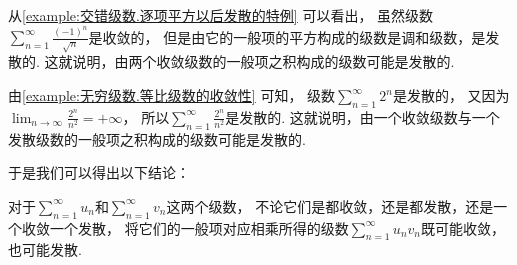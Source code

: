 从\cref{example:交错级数.逐项平方以后发散的特例} 可以看出，
虽然级数\(\sum_{n=1}^\infty \frac{(-1)^n}{\sqrt{n}}\)是收敛的，
但是由它的一般项的平方构成的级数是调和级数，是发散的.
这就说明，由两个收敛级数的一般项之积构成的级数可能是发散的.

由\cref{example:无穷级数.等比级数的收敛性} 可知，
级数\(\sum_{n=1}^\infty 2^n\)是发散的，
又因为\(\lim_{n\to\infty} \frac{2^n}{n^2} = +\infty\)，
所以\(\sum_{n=1}^\infty \frac{2^n}{n^2}\)是发散的.
这就说明，由一个收敛级数与一个发散级数的一般项之积构成的级数可能是发散的.

于是我们可以得出以下结论：
\begin{proposition}
对于\(\sum_{n=1}^\infty u_n\)和\(\sum_{n=1}^\infty v_n\)这两个级数，
不论它们是都收敛，还是都发散，还是一个收敛一个发散，
将它们的一般项对应相乘所得的级数\(\sum_{n=1}^\infty u_n v_n\)既可能收敛，也可能发散.
\end{proposition}
